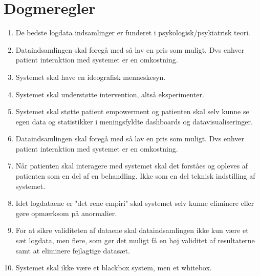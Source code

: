 \chapter{Dogmeregler}
\begin{enumerate}
	\item De bedste logdata indsamlinger er funderet i psykologisk/psykiatrisk teori.
	\item Dataindsamlingen skal foregå med så lav en pris som muligt. Dvs enhver patient interaktion med systemet er en omkostning.
	\item Systemet skal have en ideografisk menneskesyn.
	\item Systemet skal understøtte intervention, altså eksperimenter.
	\item Systemet skal støtte patient empowerment og patienten skal selv kunne se egen data og statistikker i meningsfyldte dashboards og datavisualiseringer.
	\item Dataindsamlingen skal foregå med så lav en pris som muligt. Dvs enhver patient interaktion med systemet er en omkostning.
	\item Når patienten skal interagere med systemet skal det forståes og opleves af patienten som en del af en behandling. Ikke som en del teknisk indstilling af systemet.
	\item Idet logdataene er "det rene empiri" skal systemet selv kunne eliminere eller gøre opmærksom på anormalier.
	\item For at sikre validiteten af dataene skal dataindsamlingen ikke kun være et sæt logdata, men flere, som gør det muligt få en høj validitet af resultaterne samt at eliminere fejlagtige datasæt.
	\item Systemet skal ikke være et blackbox system, men et whitebox.
\end{enumerate}